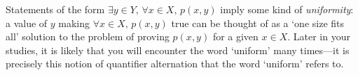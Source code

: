 Statements of the form $\exists y \in Y,\, \forall x \in X,\, p(x,y)$ imply some kind of \textit{uniformity}: a value of $y$ making $\forall x \in X,\, p(x,y)$ true can be thought of as a `one size fits all' solution to the problem of proving $p(x,y)$ for a given $x \in X$. Later in your studies, it is likely that you will encounter the word `uniform' many times---it is precisely this notion of quantifier alternation that the word `uniform' refers to.
